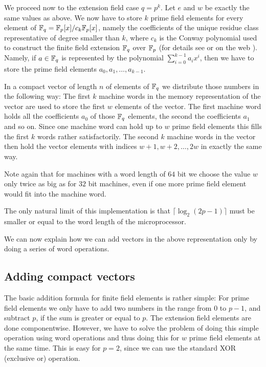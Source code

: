 We proceed now to the extension field case $q=p^k$. Let $e$ and $w$ be
exactly the same values as above. We now have to store $k$ prime field
elements for every element of $\mathbb{F}_q = \mathbb{F}_p[x]/c_k\mathbb{F}_p[x]$, namely the 
coefficients of the unique residue class representative of degree smaller 
than $k$, where $c_k$ is the Conway polynomial used to construct the 
finite field extension $\mathbb{F}_q$ over $\mathbb{F}_p$ (for details see \cite{Nickel}
or on the web \cite{ConwayFL}). Namely, if $a \in \mathbb{F}_q$ is represented by
the polynomial $\sum_{i=0}^{k-1} a_i x^i$, then we have to store the prime 
field elements $a_0, a_1, \ldots, a_{k-1}$. 

In a compact vector of length $n$ of elements of $\mathbb{F}_q$ we distribute
those numbers in the following way: The first $k$ machine words in the
memory representation of the vector are used to store the first $w$
elements of the vector. The first machine word holds all the coefficients
$a_0$ of those $\mathbb{F}_q$ elements, the second the coefficients $a_1$ and so
on. Since one machine word can hold up to $w$ prime field elements this
fills the first $k$ words rather satisfactorily. The second $k$ machine words
in the vector then hold the vector elements with indices 
$w+1, w+2, \ldots, 2w$ in exactly the same way.

Note again that for machines with a word length of $64$ bit we choose the
value $w$ only twice as big as for $32$ bit machines, even if one more
prime field element would fit into the machine word.

The only natural limit of this implementation is that 
$\lceil \log_2(2p-1) \rceil$ must be smaller or equal to the word length
of the microprocessor.

We can now explain how we can add vectors in the above representation
only by doing a series of word operations.

\subsection{Adding compact vectors}

The basic addition formula for finite field elements is rather simple:
For prime field elements we only have to add two numbers in the range 
from $0$ to $p-1$, and
subtract $p$, if the sum is greater or equal to $p$. The extension
field elements are done componentwise. However, we have to solve
the problem of doing this simple operation using word operations and 
thus doing this for $w$ prime field elements at the same time.
This is easy for $p=2$, since we can use the standard XOR (exclusive or)
operation.

